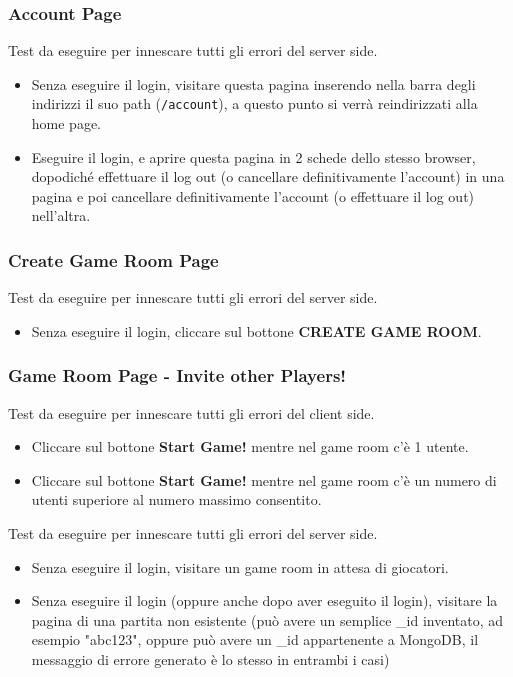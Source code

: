 \subsubsection{Account Page}

Test da eseguire per innescare tutti gli errori del server side.
\begin{itemize}
\item
	Senza eseguire il login, visitare questa pagina inserendo nella barra degli indirizzi il suo path (\texttt{/account}), a questo punto si verrà reindirizzati alla home page.
\item
	Eseguire il login, e aprire questa pagina in 2 schede dello stesso browser, dopodiché effettuare il log out (o cancellare definitivamente l'account) in una pagina e poi cancellare definitivamente l'account (o effettuare il log out) nell'altra.
\end{itemize}

\newpage

\subsubsection{Create Game Room Page}

Test da eseguire per innescare tutti gli errori del server side.
\begin{itemize}
\item
	Senza eseguire il login, cliccare sul bottone \textbf{CREATE GAME ROOM}.
\end{itemize}

\subsubsection{Game Room Page - Invite other Players!}

Test da eseguire per innescare tutti gli errori del client side.
\begin{itemize}
\item
	Cliccare sul bottone \textbf{Start Game!} mentre nel game room c'è 1 utente.
\item
	Cliccare sul bottone \textbf{Start Game!} mentre nel game room c'è un numero di utenti superiore al numero massimo consentito.
\end{itemize}

\removeHorizontalSpaceBig Test da eseguire per innescare tutti gli errori del server side.
\begin{itemize}
\item
	Senza eseguire il login, visitare un game room in attesa di giocatori.
\item
	Senza eseguire il login (oppure anche dopo aver eseguito il login), visitare la pagina di una partita non esistente (può avere un semplice \_id inventato, ad esempio "abc123", oppure può avere un \_id appartenente a MongoDB, il messaggio di errore generato è lo stesso in entrambi i casi)
\end{itemize}

